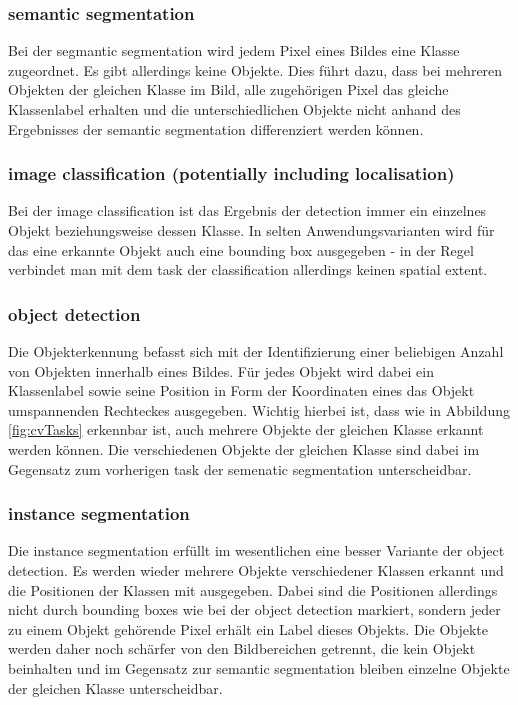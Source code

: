 \documentclass[
			   fontsize=11pt,
               paper=a4,
               bibliography=totoc,
               idxtotoc,
               headsepline,
               footsepline,
               footinclude=false,
               BCOR=12mm,
               DIV=13,
               openany,   %
               ]
               {scrbook}
\begin{document}
\subsubsection{semantic segmentation}
Bei der segmantic segmentation wird jedem Pixel eines Bildes eine Klasse zugeordnet. Es gibt allerdings keine Objekte. Dies führt dazu, dass bei mehreren Objekten der gleichen Klasse im Bild, alle zugehörigen Pixel das gleiche Klassenlabel erhalten und die unterschiedlichen Objekte nicht anhand des Ergebnisses der semantic segmentation differenziert werden können.

\subsubsection{image classification (potentially including localisation)}
Bei der image classification ist das Ergebnis der detection immer ein einzelnes Objekt beziehungsweise dessen Klasse. In selten Anwendungsvarianten wird für das eine erkannte Objekt auch eine bounding box ausgegeben - in der Regel verbindet man mit dem task der classification allerdings keinen spatial extent.

\subsubsection{object detection}
Die Objekterkennung befasst sich mit der Identifizierung einer beliebigen Anzahl von Objekten innerhalb eines Bildes. Für jedes Objekt wird dabei ein Klassenlabel sowie seine Position in Form der Koordinaten eines das Objekt umspannenden Rechteckes ausgegeben. Wichtig hierbei ist, dass wie in Abbildung \ref{fig:cvTasks} erkennbar ist, auch mehrere Objekte der gleichen Klasse erkannt werden können. Die verschiedenen Objekte der gleichen Klasse sind dabei im Gegensatz zum vorherigen task der semenatic segmentation unterscheidbar.

\subsubsection{instance segmentation}
Die instance segmentation erfüllt im wesentlichen eine besser Variante der object detection. Es werden wieder mehrere Objekte verschiedener Klassen erkannt und die Positionen der Klassen mit ausgegeben. Dabei sind die Positionen allerdings nicht durch bounding boxes wie bei der object detection markiert, sondern jeder zu einem Objekt gehörende Pixel erhält ein Label dieses Objekts. Die Objekte werden daher noch schärfer von den Bildbereichen getrennt, die kein Objekt beinhalten und im Gegensatz zur semantic segmentation bleiben einzelne Objekte der gleichen Klasse unterscheidbar.
\end{document}
